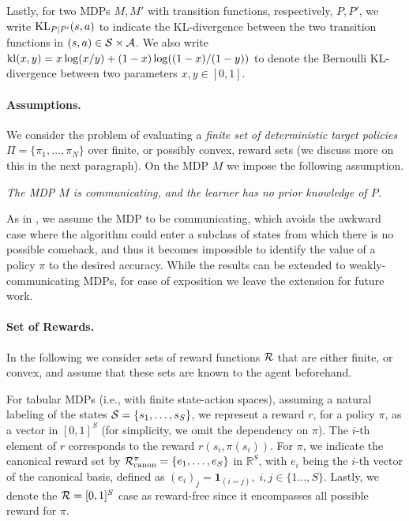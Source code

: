  Lastly,  for two MDPs $M,M'$ with transition functions, respectively, $P,P'$, we  write ${\rm KL}_{P|P'}(s,a)$ to indicate the KL-divergence between the two transition functions in $(s,a)\in {\cal S}\times {\cal A}$. We also write ${\rm kl}(x,y)=x\log(x/y)+(1-x)\log((1-x)/(1-y))$ to denote the Bernoulli KL-divergence between two parameters $x,y\in[0,1]$.





 
 \paragraph{Assumptions.} We consider the problem of evaluating a \emph{finite set of deterministic target policies} $\Pi=\{\pi_1,\dots,\pi_N\}$ over  finite, or possibly convex, reward sets (we discuss more on this in the next paragraph). On the MDP $M$ we impose the following assumption.  \begin{assumption}\label{assumption:mdp_learner}\it
    The MDP $M$ is communicating, and the learner has no prior knowledge of $P$.
\end{assumption}

As in \cite{al2021navigating, russomulti}, we assume the MDP to be communicating, which avoids the awkward case where the algorithm could enter a subclass of states from which there is no possible comeback, and thus it becomes impossible to identify the value of a policy $\pi$ to the desired accuracy.  While the results can be extended to weakly-communicating MDPs, for ease of exposition we leave the extension for future work.



\paragraph{Set of Rewards.} In the following we consider sets of reward functions  ${\cal R}$ that are either  finite, or convex, and assume that these sets are  known to the agent beforehand. 

For tabular MDPs (i.e., with finite state-action spaces), assuming a natural labeling of the states ${\cal S}=\{s_1,\dots, s_{S}\}$,
we represent a reward $r$,  for a policy $\pi$, as a vector in $[0 ,1]^{S}$ (for simplicity, we omit the dependency on $\pi$).  The $i$-th element of $r$  corresponds to the reward $r(s_i,\pi(s_i))$.
For $\pi$, we indicate the canonical reward set by ${\cal R}_{\rm canon}^\pi=\{e_1,\dots,e_{S}\}$ in $\mathbb{R}^{S}$, with $e_i$ being the $i$-th vector of the canonical basis, defined as $(e_i)_j = \mathbf{1}_{(i=j)},\; i,j\in\{1\dots,S\}$. Lastly, we denote the ${\cal R}=[0,1]^S$ case as reward-free since  it encompasses all possible reward for $\pi$.






